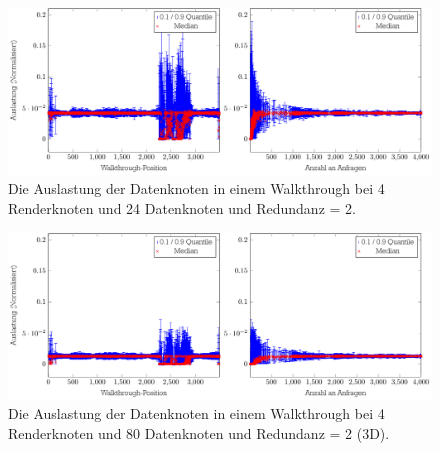 %

%


\begin{figure}
\centering
\includegraphics[scale=0.75]{images/diag_cCol_red2_render4_data24_2x.pdf}
\caption{\label{fig:eval:cCol1}Die Auslastung der Datenknoten in einem Walkthrough bei 4 Renderknoten und 24 Datenknoten und Redundanz = 2.}
\end{figure}

\begin{figure}
\centering
\includegraphics[scale=0.75]{images/diag_cCol_red2_render4_data80_2x.pdf}
\caption{\label{fig:eval:cCol2}Die Auslastung der Datenknoten in einem Walkthrough bei 4 Renderknoten und 80 Datenknoten und Redundanz = 2 (3D).}
\end{figure}

